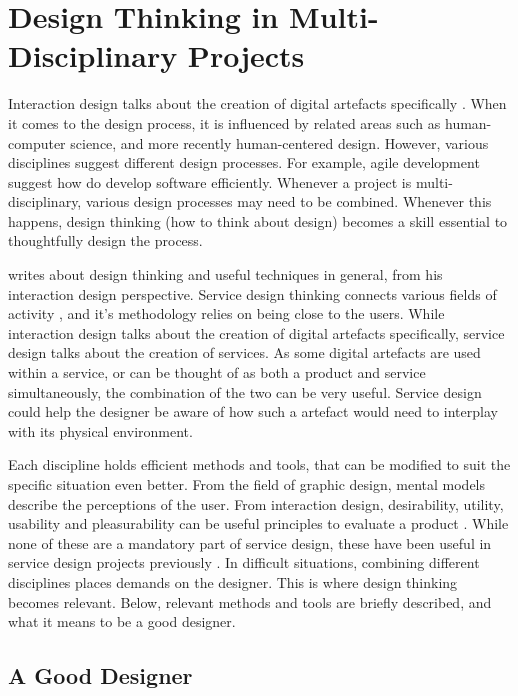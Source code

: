 \section{Design Thinking in Multi-Disciplinary Projects}

%

Interaction design talks about the creation of digital artefacts specifically \citep{lowgren}. When it comes to the design process, it is influenced by related areas such as human-computer science, and more recently human-centered design. However, various disciplines suggest different design processes. For example, agile development suggest how do develop software efficiently. Whenever a project is multi-disciplinary, various design processes may need to be combined. Whenever this happens, design thinking (how to think about design) becomes a skill essential to thoughtfully design the process.

\cite{lowgren} writes about design thinking and useful techniques in general, from his interaction design perspective. Service design thinking connects various fields of activity \citep{stickdorn}, and it's methodology relies on being close to the users. While interaction design talks about the creation of digital artefacts specifically, service design talks about the creation of services. As some digital artefacts are used within a service, or can be thought of as both a product and service simultaneously, the combination of the two can be very useful. Service design could help the designer be aware of how such a artefact would need to interplay with its physical environment.

Each discipline holds efficient methods and tools, that can be modified to suit the specific situation even better. From the field of graphic design, mental models describe the perceptions of the user. From interaction design, desirability, utility, usability and pleasurability can be useful principles to evaluate a product \citep{clatworthy}. While none of these are a mandatory part of service design, these have been useful in service design projects previously \citep{stickdorn}. In difficult situations, combining different disciplines places demands on the designer. This is where design thinking becomes relevant. Below, relevant methods and tools are briefly described, and what it means to be a good designer.

\subsection{A Good Designer}\label{aGoodDesigner}

